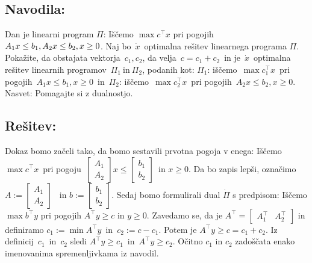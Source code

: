 \documentclass[a4paper, 10pt]{article}
\begin{document}
\subsection{Navodila:}
Dan je linearni program $\Pi$:
Iščemo $\max c^{\top}x$ pri pogojih~$A_{1}x\leq b_1, \newline A_{2}x\leq b_2, x\geq0$. Naj bo~$\dot{x}$~optimalna rešitev linearnega programa $\Pi$. Pokažite, da obstajata vektorja~$c_1, c_2$, da velja~$c=c_1+c_2$~in je~$\dot{x}$~optimalna rešitev linearnih programov~$\Pi_1~\text{in}~\Pi_2$, podanih kot:
$\Pi_1$: iščemo~$\max{c^{\top}_{1}x}$~pri pogojih~$A_{1}x\leq b_1, x\geq0$~in~$\Pi_2$: iščemo~$\max{c^{\top}_{2}x}$~pri pogojih~$A_{2}x\leq b_2, x\geq0$.
Nasvet: Pomagajte si z dualnostjo.
\subsection{Rešitev:}
Dokaz bomo začeli tako, da bomo sestavili prvotna pogoja v enega: Iščemo $\max c^{\top}x$~pri pogoju~$\begin{bmatrix}
	A_1 \\
	A_2
\end{bmatrix}x\leq \begin{bmatrix}
b_1 \\
b_2
\end{bmatrix}$~in $x\geq 0$. Da bo zapis lepši, označimo~$A := \begin{bmatrix}
A_1 \\
A_2
\end{bmatrix}$~ in $b := \begin{bmatrix}
b_1 \\
b_2
\end{bmatrix}$. Sedaj bomo formulirali dual $\dot{\Pi}$ s predpisom:
Iščemo $\max{b^{\top}y}$ pri pogojih $A^{\top}y\geq c$ in $y\geq0$. \newline Zavedamo se, da je $A^{\top} = \begin{bmatrix}
	A^{\top}_{1} & A^{\top}_{2}
\end{bmatrix}$ in definiramo $c_1 := \min A^{\top}y$~in~$c_2 := c - c_1$. Potem je $A^{\top}y \geq c = c_1 + c_2$. Iz definicij~$c_1$~in~$c_2$ sledi $A^{\top}y \geq c_1$~in~$A^{\top}y \geq c_2$. Očitno $c_1$ in $c_2$ zadoščata enako imenovanima spremenljivkama iz navodil.
\end{document}
